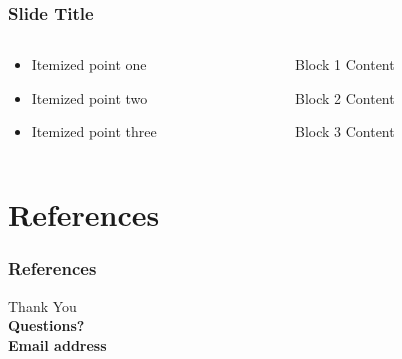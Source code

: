 \documentclass{beamer}
\begin{document}
\begin{frame}
\frametitle{Slide Title}

\begin{columns}[T]
\begin{column}{.6\textwidth}
\begin{itemize}
\item Itemized point one
\item Itemized point two
\item Itemized point three
\end{itemize}
\end{column}
\begin{column}{.4\textwidth}
\begin{block}{Block 1}
Content
\end{block}
\begin{block}{Block 2}
Content
\end{block}
\begin{block}{Block 3}
Content
\end{block}
\end{column}
\end{columns}
\end{frame}


\section{References}
\begin{frame}[allowframebreaks]
\frametitle{References}


\end{frame}

\begin{frame}
\begin{center}
\end{center}
\begin{center}
{\Huge Thank You} \\
\vspace{20pt}
\textbf{Questions?}\\
\vspace{10pt}
\textbf{Email address}
\end{center}
\end{frame}
\end{document}

